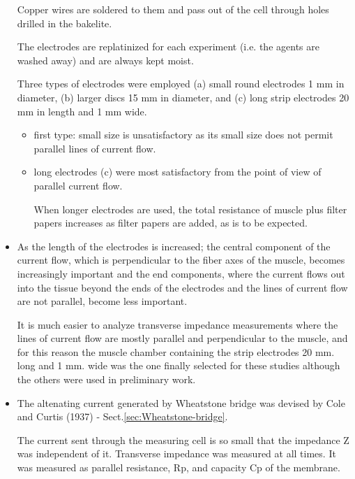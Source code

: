\begin{itemize}
Copper wires are soldered to them and pass out of the cell through holes drilled
in the bakelite.

The electrodes are replatinized for each experiment (i.e. the agents are
washed away) and are always kept moist.

Three types of electrodes were employed (a) small round electrodes 1 mm
in diameter, (b) larger discs 15 mm in diameter, and (c) long strip electrodes
20 mm in length and 1 mm wide.
\begin{itemize}
  \item first type: small size is unsatisfactory as its small size does not permit parallel lines of
current flow.

  \item long electrodes (c) were most satisfactory from the point of
view of parallel current flow.

When longer electrodes are used, the total resistance of muscle plus filter
papers increases as filter papers are added, as is to be expected.
 
\end{itemize}

  \item As the length of the electrodes is increased; the
central component of the current flow, which is perpendicular to the fiber axes
of the muscle, becomes increasingly important and the end components, where the
current flows out into the tissue beyond the ends of the electrodes and the lines of
current flow are not parallel, become less important. 

It is much easier to analyze transverse impedance measurements where the lines
of current flow are mostly parallel and perpendicular to the muscle, and for
this reason the muscle chamber containing the strip electrodes 20 mm. long and 1
mm. wide was the one finally selected for these studies although the others
were used in preliminary work.
   
   \item The altenating current generated by Wheatstone bridge was devised
   by Cole and Curtis (1937) - Sect.\ref{sec:Wheatstone-bridge}. 

The current sent through the measuring cell is so small that the impedance Z was
independent of it. Transverse impedance was measured at all times. It was
measured as parallel resistance, Rp, and capacity Cp of the membrane.

\end{itemize}

